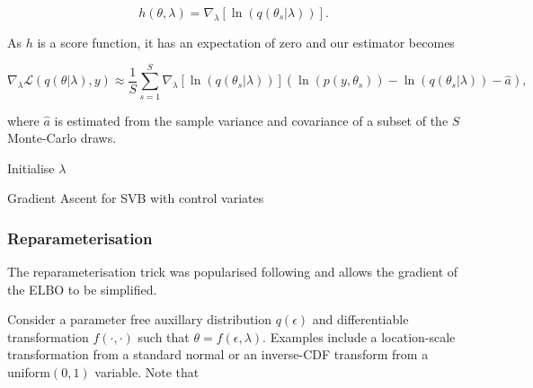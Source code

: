 \documentclass{article}\usepackage[]{graphicx}\usepackage[]{color}
\numberwithin{equation}{section}
\begin{document}
\begin{equation}
\label{CV6}
h(\theta, \lambda) = \nabla_{\lambda} [\ln(q(\theta_s | \lambda))].
\end{equation}

As $h$ is a score function, it has an expectation of zero and our estimator becomes

\begin{equation}
\label{CV7}
\nabla_{\lambda} \mathcal{L}(q(\theta | \lambda), y) \approx \frac{1}{S}\sum_{s=1}^{S} \nabla_{\lambda} [\ln(q(\theta_s | \lambda))] (\ln (p(y, \theta_s)) - \ln(q(\theta_s | \lambda)) - \hat{a}),
\end{equation}

where $\hat{a}$ is estimated from the sample variance and covariance of a subset of the $S$ Monte-Carlo draws.

\begin{algorithm}[H]
 Initialise $\lambda$\;
 \caption{Gradient Ascent for SVB with control variates}
  \label{alg:algorithm3}
\end{algorithm}

\subsubsection{Reparameterisation}

The reparameterisation trick was popularised following \citet{Kingma2013} and allows the gradient of the ELBO to be simplified.

Consider a parameter free auxillary distribution $q(\epsilon)$ and differentiable transformation $f(\cdot,\cdot)$ such that $\theta = f(\epsilon, \lambda)$. Examples include a location-scale transformation from a standard normal or an inverse-CDF transform from a uniform$(0, 1)$ variable. Note that 
\end{document}
